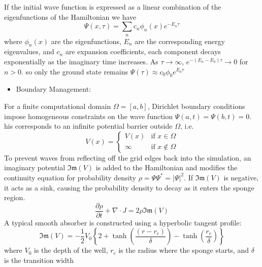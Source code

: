 \documentclass[11pt]{article}
\begin{document}
If the initial wave function is expressed as a linear combination of the eigenfunctions of the Hamiltonian we have
\begin{equation}
	\Psi(x, \tau) = \sum_{n} c_n \phi_n (x) e^{-E_n \tau}
\end{equation}
where $\phi_n(x)$ are the eigenfunctions, $E_n$ are the corresponding energy eigenvalues, and $c_n$ are expansion coefficients, each component decays exponentially as the imaginary time increases. As $ \tau \to \infty $, $e^{-(E_n - E_0) \tau} \to 0$ for $n > 0$. so only the ground state remains $\Psi (\tau) \approx c_0 \phi_0 e^{E_0 \tau}$

\begin{itemize}
	\item 
	Boundary Management:
\end{itemize}
For a finite computational domain $\Omega = [a,b]$, Dirichlet boundary conditions impose homogeneous constraints on the wave function $\Psi(a,t) = \Psi(b,t) = 0$. his corresponds to an infinite potential barrier outside $\Omega$, i.e.
\begin{equation}
	V(x) = 
	\begin{cases} 
		V(x) & \text{if } x \in \Omega \\
		\infty & \text{if } x \notin \Omega 
	\end{cases}
\end{equation}
To prevent waves from reflecting off the grid edges back into the simulation, an imaginary potential $\mathfrak{Im}(V)$ is added to the Hamiltonian and modifies the continuity equation for probability density $\rho = \Psi \Psi^* = |\Psi|^2$. If $\mathfrak{Im}(V)$ is negative, it acts as a sink, causing the probability density to decay as it enters the sponge region.
\begin{equation}
	\frac{\partial \rho}{\partial t} + \nabla \cdot J = 2 \rho \mathfrak{Im}(V)
\end{equation}
A typical smooth absorber is constructed using a hyperbolic tangent profile:
\begin{equation}
	\mathfrak{Im}(V) = - \frac{1}{2} V_0 \left\{ 2 + \tanh \left( \frac{(r - r_c)}{\delta}  \right) - \tanh (\frac{r_c}{\delta}) \right\}
\end{equation}
 where $V_0$ is the depth of the well, $r_c$ is the radius where the sponge starts, and $\delta$ is the transition width
\end{document}
